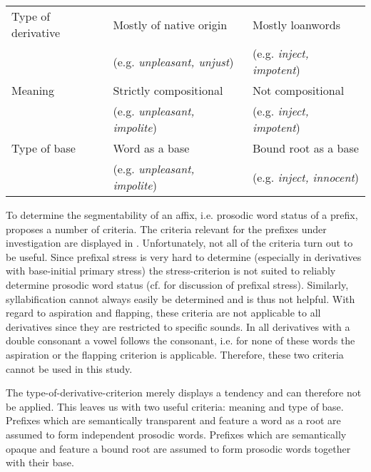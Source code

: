 \begin{table*}[t!]
\begin{tabular}{lll}
			Type of derivative & Mostly of native origin & Mostly loanwords \\ 
			& (e.g. \textit{unpleasant, unjust}) & (e.g. \textit{inject, impotent})
			\vspace{0.3 cm}\\ 
						
			Meaning & Strictly compositional & Not compositional\\
							& (e.g. \textit{unpleasant, impolite}) & (e.g. \textit{inject, impotent})
			\vspace{0.3 cm}\\  
			
			Type of base & Word as a base & Bound root as a base\\
										& (e.g. \textit{unpleasant, impolite}) & (e.g. \textit{inject, innocent})
			\vspace{0.3 cm}\\ 
			

						\hline
		\end{tabular}
\end{table*}

To determine the segmentability of an affix, i.e. prosodic word status of a prefix, \cite{Raffelsiefen.1999} proposes a number of criteria. The criteria relevant for the prefixes under investigation are displayed in . Unfortunately, not all of the criteria turn out to be useful. Since prefixal stress is very hard to determine (especially in derivatives with base-initial primary stress) the stress-criterion is not suited to reliably determine prosodic word status (cf.  for discussion of prefixal stress). Similarly, syllabification cannot always easily be determined and is thus not helpful. 
With regard to aspiration and flapping, these criteria are not applicable to all derivatives since they are restricted to specific sounds. In all derivatives with a double consonant a vowel follows the consonant, i.e. for none of these words the aspiration or the flapping criterion is applicable. Therefore, these two criteria cannot be used in this study.

The type-of-derivative-criterion merely displays a tendency and can therefore not be applied. 
This leaves us with two useful criteria: meaning and type of base. Prefixes which are semantically transparent and feature a word as a root are assumed to form independent prosodic words. Prefixes which are semantically opaque and feature a bound root are assumed to form prosodic words together with their base. 

